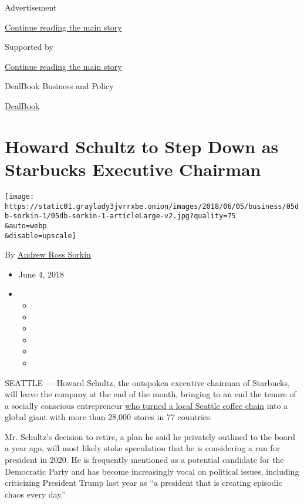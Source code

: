 Advertisement

\protect\hyperlink{after-top}{Continue reading the main story}

Supported by

\protect\hyperlink{after-sponsor}{Continue reading the main story}

DealBook Business and Policy

\href{/column/dealbook}{DealBook}

\hypertarget{howard-schultz-to-step-down-as-starbucks-executive-chairman}{%
\section{Howard Schultz to Step Down as Starbucks Executive
Chairman}\label{howard-schultz-to-step-down-as-starbucks-executive-chairman}}

\texttt{[image: https://static01.graylady3jvrrxbe.onion/images/2018/06/05/business/05db-sorkin-1/05db-sorkin-1-articleLarge-v2.jpg?quality=75\\\&auto=webp\\\&disable=upscale]}

By \href{http://www.nytimes3xbfgragh.onion/by/andrew-ross-sorkin}{Andrew
Ross Sorkin}

\begin{itemize}
\item
  June 4, 2018
\item
  \begin{itemize}
  \item
  \item
  \item
  \item
  \item
  \item
  \end{itemize}
\end{itemize}

SEATTLE --- Howard Schultz, the outspoken executive chairman of
Starbucks, will leave the company at the end of the month, bringing to
an end the tenure of a socially conscious entrepreneur
\href{https://www.nytimes3xbfgragh.onion/2016/12/01/business/dealbook/starbucks-chief-howard-schultz-to-step-down-next-year.html}{who
turned a local Seattle coffee chain} into a global giant with more than
28,000 stores in 77 countries.

Mr. Schultz's decision to retire, a plan he said he privately outlined
to the board a year ago, will most likely stoke speculation that he is
considering a run for president in 2020. He is frequently mentioned as a
potential candidate for the Democratic Party and has become increasingly
vocal on political issues, including criticizing President Trump last
year as ``a president that is creating episodic chaos every day.''

